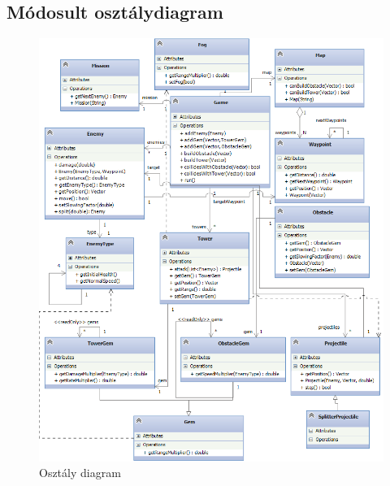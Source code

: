 \subsection{Módosult osztálydiagram}
\begin{figure}[H]
\begin{center}
\includegraphics[width=17cm]{images/ch07/class_new.png}
\caption{Osztály diagram}
\label{fig:classDiagNew}
\end{center}
\end{figure}

